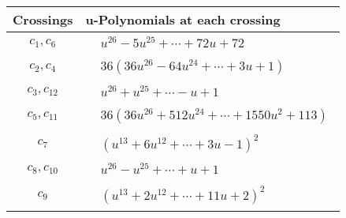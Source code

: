 \documentclass[1p]{elsarticle_modified}
\theoremstyle{definition}
\begin{document}
\begin{tabular}{m{50pt}|m{274pt}}
Crossings & \hspace{64pt}u-Polynomials at each crossing \\
\hline $$\begin{aligned}c_{1},c_{6}\end{aligned}$$&$\begin{aligned}
&u^{26}-5 u^{25}+\cdots+72 u+72
\end{aligned}$\\
\hline $$\begin{aligned}c_{2},c_{4}\end{aligned}$$&$\begin{aligned}
&36(36 u^{26}-64 u^{24}+\cdots+3 u+1)
\end{aligned}$\\
\hline $$\begin{aligned}c_{3},c_{12}\end{aligned}$$&$\begin{aligned}
&u^{26}+u^{25}+\cdots- u+1
\end{aligned}$\\
\hline $$\begin{aligned}c_{5},c_{11}\end{aligned}$$&$\begin{aligned}
&36(36 u^{26}+512 u^{24}+\cdots+1550 u^2+113)
\end{aligned}$\\
\hline $$\begin{aligned}c_{7}\end{aligned}$$&$\begin{aligned}
&(u^{13}+6 u^{12}+\cdots+3 u-1)^{2}
\end{aligned}$\\
\hline $$\begin{aligned}c_{8},c_{10}\end{aligned}$$&$\begin{aligned}
&u^{26}- u^{25}+\cdots+u+1
\end{aligned}$\\
\hline $$\begin{aligned}c_{9}\end{aligned}$$&$\begin{aligned}
&(u^{13}+2 u^{12}+\cdots+11 u+2)^{2}
\end{aligned}$\\
\hline
\end{tabular}\\~\\
\newpage\renewcommand{\arraystretch}{1}
\end{document}
